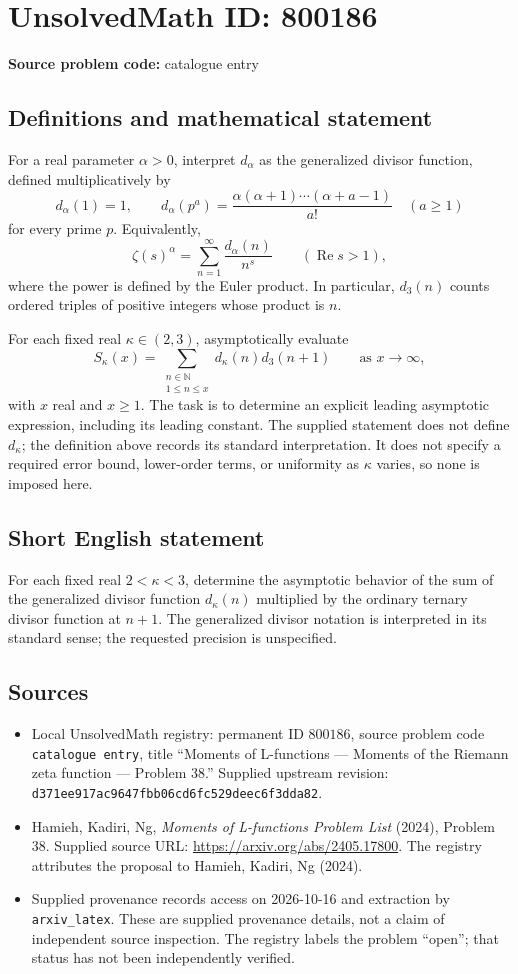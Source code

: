 \documentclass[11pt]{article}
\newcommand{\N}{\mathbb{N}}
\begin{document}
\section*{UnsolvedMath ID: 800186}
\textbf{Source problem code:} catalogue entry
\subsection{Definitions and mathematical statement}
For a real parameter \(\alpha>0\), interpret \(d_\alpha\) as the generalized divisor function, defined multiplicatively by
\[
d_\alpha(1)=1,\qquad d_\alpha(p^a)=\frac{\alpha(\alpha+1)\cdots(\alpha+a-1)}{a!}\quad(a\geq1)
\]
for every prime \(p\). Equivalently,
\[
\zeta(s)^\alpha=\sum_{n=1}^{\infty}\frac{d_\alpha(n)}{n^s}\qquad(\operatorname{Re}s>1),
\]
where the power is defined by the Euler product. In particular, \(d_3(n)\) counts ordered triples of positive integers whose product is \(n\).

For each fixed real \(\kappa\in(2,3)\), asymptotically evaluate
\[
S_\kappa(x)=\sum_{\substack{n\in\N\\1\leq n\leq x}}d_\kappa(n)d_3(n+1)
\qquad\text{as }x\to\infty,
\]
with \(x\) real and \(x\geq1\). The task is to determine an explicit leading asymptotic expression, including its leading constant. The supplied statement does not define \(d_\kappa\); the definition above records its standard interpretation. It does not specify a required error bound, lower-order terms, or uniformity as \(\kappa\) varies, so none is imposed here.
\subsection{Short English statement}
For each fixed real \(2<\kappa<3\), determine the asymptotic behavior of the sum of the generalized divisor function \(d_\kappa(n)\) multiplied by the ordinary ternary divisor function at \(n+1\). The generalized divisor notation is interpreted in its standard sense; the requested precision is unspecified.
\subsection{Sources}
\begin{itemize}
\item Local UnsolvedMath registry: permanent ID \(800186\), source problem code \texttt{catalogue entry}, title ``Moments of L-functions --- Moments of the Riemann zeta function --- Problem 38.'' Supplied upstream revision: \texttt{d371ee917ac9647fbb06cd6fc529deec6f3dda82}.
\item Hamieh, Kadiri, Ng, \emph{Moments of L-functions Problem List} (2024), Problem 38. Supplied source URL: \url{https://arxiv.org/abs/2405.17800}. The registry attributes the proposal to Hamieh, Kadiri, Ng (2024).
\item Supplied provenance records access on 2026-10-16 and extraction by \texttt{arxiv\_latex}. These are supplied provenance details, not a claim of independent source inspection. The registry labels the problem ``open''; that status has not been independently verified.
\end{itemize}
\end{document}
